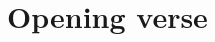 \documentclass[letterpaper]{book}
\begin{document}
\pagestyle{empty}
\tableofcontents
\pagestyle{fancy}

\makeatletter
\renewcommand*\cleardoublepage{\clearpage\if@twoside
  \ifodd\c@page \hbox{}\newpage\if@twocolumn\hbox{}%
  \newpage\fi\fi\fi}
\makeatother


\chapter{Opening verse}

{%
\parindent 0pt
\noindent
\ifx\preLilyPondExample \undefined
\else
  \expandafter\preLilyPondExample
\fi
\def\lilypondbook{}%

\ifx\postLilyPondExample \undefined
\else
  \expandafter\postLilyPondExample
\fi
}
\end{document}
